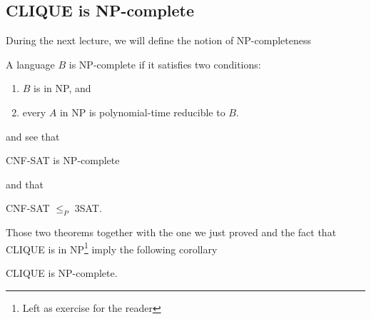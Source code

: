 \subsection{CLIQUE is NP-complete}

During the next lecture, we will define the notion of NP-completeness
\begin{definition}
	A language \(B\) is NP-complete if it satisfies two conditions:
	\begin{enumerate}
		\item \(B\) is in NP, and
		\item every \(A\) in NP is polynomial-time reducible to \(B\).
	\end{enumerate}
\end{definition}
and see that
\begin{theorem}
	CNF-SAT is NP-complete
\end{theorem}
and that
\begin{theorem}
	CNF-SAT \(\le_P\) 3SAT.
\end{theorem}
Those two theorems together with the one we just proved and the fact that
CLIQUE is in NP\footnote{Left as exercise for the reader}
imply the following corollary
\begin{corollary}
	CLIQUE is NP-complete.
\end{corollary}
